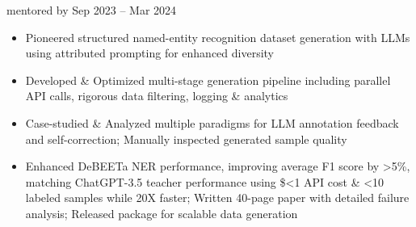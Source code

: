     {{\bodyfontsize \color{body} mentored by} }
    {Sep 2023 -- Mar 2024}{}{}
\begin{itemize}

    \item Pioneered structured named-entity recognition dataset generation with LLMs using attributed prompting for enhanced diversity

    \item Developed \& Optimized multi-stage generation pipeline including parallel API calls, rigorous data filtering, logging \& analytics

    \item Case-studied \& Analyzed multiple paradigms for LLM annotation feedback and self-correction; Manually inspected generated sample quality

    \item Enhanced DeBEETa NER performance, improving average F1 score by >5\%, matching ChatGPT-3.5 teacher performance
    using \$<1 API cost \& <10 labeled samples while 20X faster; Written 40-page paper with detailed failure analysis; Released package for scalable data generation
\end{itemize}
\dividerSmall


